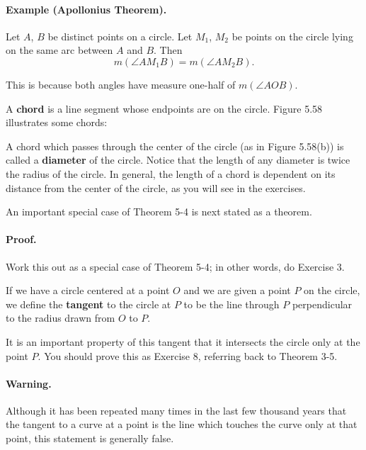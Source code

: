 \documentclass[12pt]{book} %
\begin{document}

\paragraph{Example (Apollonius Theorem).}
Let $A$, $B$ be distinct points on a circle.
Let $M_1$, $M_2$ be points on the circle lying on the same arc between $A$
and $B$. Then
\[
m(\angle AM_1B)=m(\angle AM_2B).
\]

This is because both angles have measure one-half of $m(\angle AOB)$.


A \textbf{chord} is a line segment whose endpoints are on the circle. Figure 5.58 illustrates some chords:


A chord which passes through the center of the circle (as in Figure 5.58(b)) is called a \textbf{diameter} of the circle. Notice that the length of any diameter is twice the radius of the circle. In general, the length of a chord is dependent on its distance from the center of the circle, as you will see in the exercises.

An important special case of Theorem 5-4 is next stated as a theorem.


\paragraph{Proof.}
Work this out as a special case of Theorem 5-4; in other words, do Exercise 3.

If we have a circle centered at a point $O$ and we are given a point $P$ on the circle, we define the \textbf{tangent} to the circle at $P$ to be the line through $P$ perpendicular to the radius drawn from $O$ to $P$.


It is an important property of this tangent that it intersects the circle only at the point $P$. You should prove this as Exercise 8, referring back to Theorem 3-5.

\paragraph{Warning.}
Although it has been repeated many times in the last few thousand years that the tangent to a curve at a point is the line which touches the curve only at that point, this statement is generally false.
\end{document}
